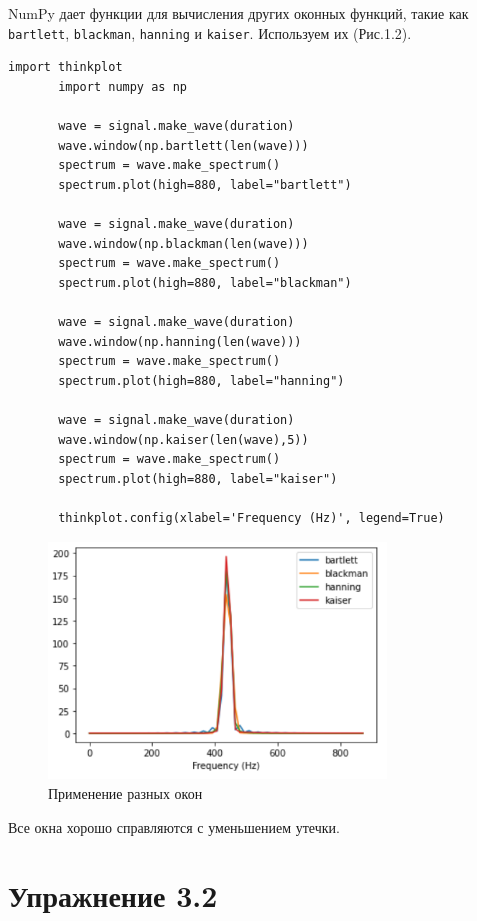 \documentclass[a4paper,12pt]{report}
\begin{document}
    NumPy дает функции для вычисления других оконных функций, такие как \texttt{bartlett}, \texttt{blackman}, \texttt{hanning} и \texttt{kaiser}. Используем их (Рис.1.2).
\begin{lstlisting}[caption=Вычисление разных оконных функций]
       import thinkplot
       import numpy as np
       
       wave = signal.make_wave(duration)
       wave.window(np.bartlett(len(wave)))
       spectrum = wave.make_spectrum()
       spectrum.plot(high=880, label="bartlett")

       wave = signal.make_wave(duration)
       wave.window(np.blackman(len(wave)))
       spectrum = wave.make_spectrum()
       spectrum.plot(high=880, label="blackman")

       wave = signal.make_wave(duration)
       wave.window(np.hanning(len(wave)))
       spectrum = wave.make_spectrum()
       spectrum.plot(high=880, label="hanning")

       wave = signal.make_wave(duration)
       wave.window(np.kaiser(len(wave),5))
       spectrum = wave.make_spectrum()
       spectrum.plot(high=880, label="kaiser")

       thinkplot.config(xlabel='Frequency (Hz)', legend=True)
\end{lstlisting}
\begin{figure}[H]
        \centering
        \includegraphics[width=0.8\textwidth]{fig1-2.PNG}
        \caption{Применение разных окон}
        \label{fig:fig1-2}
\end{figure}
    
    Все окна хорошо справляются с уменьшением утечки.
    
\chapter{Упражнение 3.2}
\end{document}
